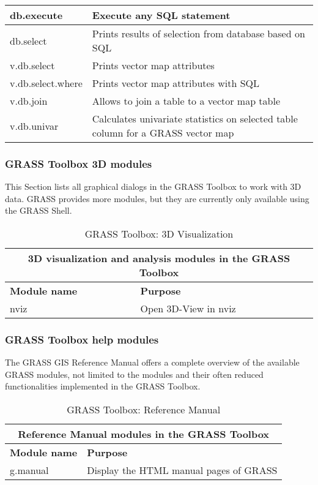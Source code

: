 \begin{table}[ht]
\begin{tabular}{|p{4cm}|p{12cm}|}
  \hline db.execute & Execute any SQL statement \\
  \hline db.select & Prints results of selection from database based on SQL \\
  \hline v.db.select & Prints vector map attributes \\
  \hline v.db.select.where & Prints vector map attributes with SQL \\
  \hline v.db.join & Allows to join a table to a vector map table \\
  \hline v.db.univar & Calculates univariate statistics on selected table
  column for a GRASS vector map \\
\hline
\end{tabular}
\end{table}

\clearpage

\subsubsection{GRASS Toolbox 3D modules}

This Section lists all graphical dialogs in the GRASS Toolbox to work with 3D 
data. GRASS provides more modules, but they are currently only available using 
the GRASS Shell.

\begin{table}[ht]
\centering
\caption{GRASS Toolbox: 3D Visualization}\medskip
 \begin{tabular}{|p{4cm}|p{12cm}|}
  \hline \multicolumn{2}{|c|}{\textbf{3D visualization and analysis modules in the GRASS
  Toolbox}} \\
  \hline \textbf{Module name} & \textbf{Purpose} \\
  \hline nviz & Open 3D-View in nviz\\
\hline
\end{tabular}
\end{table}

\subsubsection{GRASS Toolbox help modules}

The GRASS GIS Reference Manual offers a complete overview of the available 
GRASS modules, not limited to the modules and their often reduced functionalities 
implemented in the GRASS Toolbox. 

\begin{table}[ht]
\centering
\caption{GRASS Toolbox: Reference Manual}\medskip
 \begin{tabular}{|p{4cm}|p{12cm}|}
  \hline \multicolumn{2}{|c|}{\textbf{Reference Manual modules in the GRASS
  Toolbox}} \\
  \hline \textbf{Module name} & \textbf{Purpose} \\
  \hline g.manual & Display the HTML manual pages of GRASS \\
\hline
\end{tabular}
\end{table}




